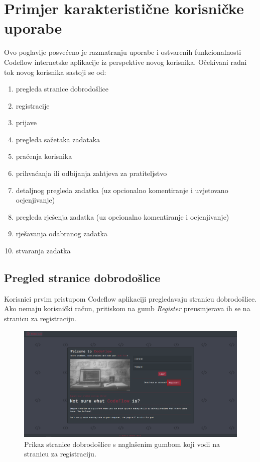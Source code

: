 \documentclass[times, utf8, zavrsni, numeric]{fer}
\begin{document}
	\chapter{Primjer karakteristične korisničke uporabe}
	Ovo poglavlje posvećeno je razmatranju uporabe i ostvarenih funkcionalnosti Codeflow internetske aplikacije iz perspektive novog korisnika. Očekivani radni tok novog korisnika sastoji se od:
	\begin{enumerate}
		\item pregleda stranice dobrodošlice
		\item registracije
		\item prijave
		\item pregleda sažetaka zadataka
		\item praćenja korisnika
		\item prihvaćanja ili odbijanja zahtjeva za pratiteljstvo
		\item detaljnog pregleda zadatka (uz opcionalno komentiranje i uvjetovano ocjenjivanje)
		\item pregleda rješenja zadatka (uz opcionalno komentiranje i ocjenjivanje)
		\item rješavanja odabranog zadatka
		\item stvaranja zadatka
	\end{enumerate}

		\section{Pregled stranice dobrodošlice}
		Korisnici prvim pristupom Codeflow aplikaciji pregledavaju stranicu dobrodošlice. Ako nemaju korisnički račun, pritiskom na gumb \textit{Register} preusmjerava ih se na stranicu za registraciju.
		\begin{figure}[H]
			\centering
			\includegraphics[width=\linewidth]{pictures/koristenje/StranicaDobrodoslice.png}
			\caption{Prikaz stranice dobrodošlice s naglašenim gumbom koji vodi na stranicu za registraciju.}
			\label{fig:welcome}
		\end{figure}
	
\end{document}
